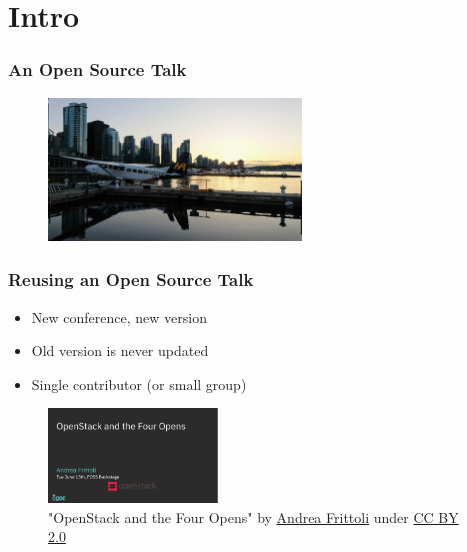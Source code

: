 \documentclass[aspectratio=169,11pt,hyperref={colorlinks=true}]{beamer}
\begin{document}
\section{Intro}
\begin{frame}[c]
  \frametitle{An Open Source Talk}
    \begin{overlayarea}{\textwidth}{.2\textheight}
      \begin{itemize}
      \end{itemize}
    \end{overlayarea}
    \begin{figure}
      \includegraphics[width=0.6\textwidth]{pictures/vancouver_harbour_plane.jpg}
    \end{figure}
\end{frame}

\begin{frame}
  \frametitle{Reusing an Open Source Talk}
    \begin{overlayarea}{\textwidth}{.3\textheight}
      \begin{itemize}
          \item{New conference, new version}
          \item{Old version is never updated}
          \item{Single contributor (or small group)}
      \end{itemize}
    \end{overlayarea}
    \begin{figure}
      \includegraphics[width=0.4\textwidth]{pictures/old_presentation.png}
         \caption{"OpenStack and the Four Opens" by \href{https://afrittoli.github.io/openstack-four-opens/}{Andrea Frittoli} under \href{https://creativecommons.org/licenses/by/2.0/}{CC BY 2.0}}
    \end{figure}
\end{frame}
\end{document}
